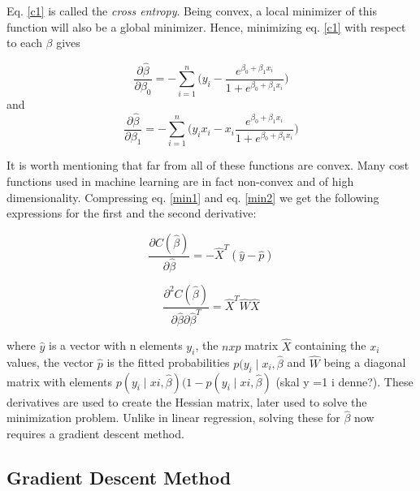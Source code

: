 \documentclass[a4paper,11pt,twocolumn]{article}
\begin{document}
Eq. \eqref{c1} is called the \textit{cross entropy}. Being convex, a local minimizer of this function will also be a global minimizer. Hence, minimizing eq. \eqref{c1} with respect to each $\beta$ gives 


\begin{equation}
\frac{\partial\hat{\beta}}{\partial\beta_0}=
-\sum\limits_{i=1}^n\big(y_i-\frac{e^{\beta_0+\beta_1x_i}}{1+e^{\beta_0+\beta_1x_i}}\big)
\label{min1}
\end{equation}
and 
\begin{equation}
\frac{\partial\hat{\beta}}{\partial\beta_1}=
-\sum\limits_{i=1}^n\big(y_ix_i-x_i\frac{e^{\beta_0+\beta_1x_i}}{1+e^{\beta_0+\beta_1x_i}}\big)
\label{min2}
\end{equation}

It is worth mentioning that far from all of these functions are convex. Many cost functions used in machine learning are in fact non-convex and of high dimensionality. Compressing eq. \eqref{min1} and eq. \eqref{min2} we get the following expressions for the first and the second derivative:

\begin{equation}
\frac{\partial C(\hat{\beta})}{\partial\hat{\beta}}=-\hat{X}^T(\hat{y}-\hat{p})
\label{compcost1}
\end{equation}

\begin{equation}
\frac{\partial^2C(\hat{\beta})}{\partial\hat{\beta}\partial\hat{\beta}^T}=\hat{X}^T\hat{W}\hat{X}
\label{compcost2}
\end{equation}

where $\hat{y}$ is a vector with n elements $y_i$, the $n x p$ matrix $\hat{X}$ containing the $x_i$ values, the vector $\hat{p}$ is the fitted probabilities $p(y_i\mid x_i,\hat{\beta}$ and $\hat{W}$ being a diagonal matrix with elements $p(y_i\mid xi,\hat{\beta})(1-p(y_i\mid xi,\hat{\beta})$ (skal y =1 i denne?). These derivatives are used to create the Hessian matrix, later used to solve the minimization problem. Unlike in linear regression, solving these for $\hat{\beta}$ now requires a gradient descent method\cite{slides}. 

\subsection{Gradient Descent Method}
\end{document}
